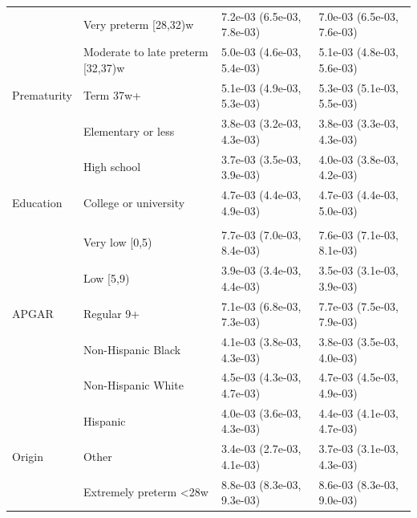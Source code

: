 \documentclass[10pt, twoside, parskip=half]{article}
\begin{document}
\begin{table}[t]
\begin{tabular}{llll}
 & Very preterm [28,32)w & 7.2e-03 (6.5e-03, 7.8e-03) & 7.0e-03 (6.5e-03, 7.6e-03)\\

 & Moderate to late preterm [32,37)w & 5.0e-03 (4.6e-03, 5.4e-03) & 5.1e-03 (4.8e-03, 5.6e-03)\\

\multirow{-4}{*}{\raggedright\arraybackslash \hspace{1em}Prematurity} & Term 37w+ & 5.1e-03 (4.9e-03, 5.3e-03) & 5.3e-03 (5.1e-03, 5.5e-03)\\
\cmidrule{1-4}
 & Elementary or less & 3.8e-03 (3.2e-03, 4.3e-03) & 3.8e-03 (3.3e-03, 4.3e-03)\\

 & High school & 3.7e-03 (3.5e-03, 3.9e-03) & 4.0e-03 (3.8e-03, 4.2e-03)\\

\multirow{-3}{*}{\raggedright\arraybackslash \hspace{1em}Education} & College or university & 4.7e-03 (4.4e-03, 4.9e-03) & 4.7e-03 (4.4e-03, 5.0e-03)\\
\cmidrule{1-4}
\addlinespace[0.3em]
\multicolumn{4}{l}{\textbf{2000-2005}}\\
 & Very low [0,5) & 7.7e-03 (7.0e-03, 8.4e-03) & 7.6e-03 (7.1e-03, 8.1e-03)\\

 & Low [5,9) & 3.9e-03 (3.4e-03, 4.4e-03) & 3.5e-03 (3.1e-03, 3.9e-03)\\

\multirow{-3}{*}{\raggedright\arraybackslash \hspace{1em}APGAR} & Regular 9+ & 7.1e-03 (6.8e-03, 7.3e-03) & 7.7e-03 (7.5e-03, 7.9e-03)\\
\cmidrule{1-4}
 & Non-Hispanic Black & 4.1e-03 (3.8e-03, 4.3e-03) & 3.8e-03 (3.5e-03, 4.0e-03)\\

 & Non-Hispanic White & 4.5e-03 (4.3e-03, 4.7e-03) & 4.7e-03 (4.5e-03, 4.9e-03)\\

 & Hispanic & 4.0e-03 (3.6e-03, 4.3e-03) & 4.4e-03 (4.1e-03, 4.7e-03)\\

\multirow{-4}{*}{\raggedright\arraybackslash \hspace{1em}Origin} & Other & 3.4e-03 (2.7e-03, 4.1e-03) & 3.7e-03 (3.1e-03, 4.3e-03)\\
\cmidrule{1-4}
 & Extremely preterm <28w & 8.8e-03 (8.3e-03, 9.3e-03) & 8.6e-03 (8.3e-03, 9.0e-03)\\


\end{tabular}
\end{table}
\end{document}
